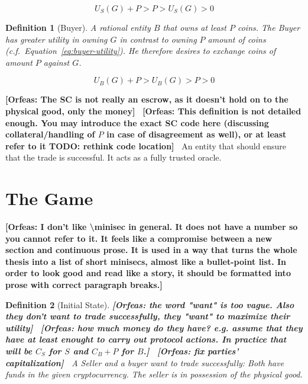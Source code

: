 \documentclass{cacthesis}
\newcommand{\authnote}[3]{{ \footnotesize \textbf{#1[#2: #3]~}}}
\newcommand{\orfnote}[1]{\authnote{\color{blue}}{Orfeas}{#1}}
\newtheorem{definition}{Definition}
\begin{document}
\begin{equation}
\label{eq:seller-utility}
    U_S(G) + P > P > U_S(G) > 0
\end{equation}

\begin{definition}[Buyer]
\label{def:buyer}
A rational entity $B$ that owns at least $P$ coins. The Buyer has greater utility in owning $G$ in contrast to  owning $P$ amount of coins (c.f.~Equation~\ref{eq:buyer-utility}). He therefore desires to exchange coins of amount $P$ against $G$.
\end{definition}

\begin{equation}
\label{eq:buyer-utility}
    U_B(G) + P > U_B(G) > P > 0
\end{equation}

\orfnote{The SC is not really an escrow, as it doesn't hold on to the physical
good, only the money}
\orfnote{This definition is not detailed enough. You may introduce the exact
SC code here (discussing collateral/handling of $P$ in case of
disagreement as well), or at least refer to it TODO: rethink code location}
 An entity that should ensure that the trade is successful. It acts as a fully trusted oracle.

\section{The Game}
\label{sec:the-game}
\orfnote{I don't like \textbackslash{}minisec in general. It does not have a
number so you cannot refer to it. It feels like a compromise between a new
section and continuous prose. It is used in a way that turns the whole thesis
into a list of short minisecs, almost like a bullet-point list. In order to look
good and read like a story, it should be formatted into prose with correct
paragraph breaks.}

\begin{definition}[Initial State]
\label{def:initial-state}
\orfnote{the word "want" is too vague. Also they don't want to trade
successfully, they "want" to maximize their utility}
\orfnote{how much money do they have? e.g. assume that they have at least
enought to carry out protocol actions. In practice that will be $C_S$ for $S$
and $C_B + P$ for $B$.}
\orfnote{fix parties' capitalization}
A Seller and a buyer want to trade successfully: Both have funds in the given cryptocurrency. The seller is in possession of the physical good.
\end{definition} 
\end{document}
